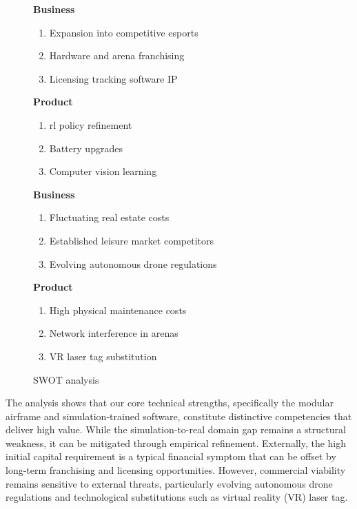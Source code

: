 \documentclass{report_template_oxford}
\begin{document}
\begin{figure}[htbp]
\begin{minipage}{\textwidth}
\begin{tcbraster}[raster columns=2, raster row skip=1mm, boxrule=0mm, arc=0mm]
\begin{tcolorbox}[equal height group=B, size=fbox, colback=swotO!60, colframe=swotO!80!black, title=\textsc{Opportunities}]
\textbf{Business} \vspace{-1em}
\begin{enumerate}
\setlength{\itemsep}{3pt}
\setlength{\parskip}{0pt}
\item Expansion into competitive esports
\item Hardware and arena franchising
\item Licensing tracking software IP
\end{enumerate}
\tcblower
\textbf{Product} \vspace{-1em}
\begin{enumerate}
\setlength{\itemsep}{3pt}
\setlength{\parskip}{0pt}
\item \gls{rl} policy refinement
\item Battery upgrades
\item Computer vision learning
\end{enumerate}
\end{tcolorbox}
\begin{tcolorbox}[equal height group=B, size=fbox, colback=swotT!60, colframe=swotT!80!black, title=\textsc{Threats}]
\textbf{Business} \vspace{-1em}
\begin{enumerate}
\setlength{\itemsep}{3pt}
\setlength{\parskip}{0pt}
\item Fluctuating real estate costs
\item Established leisure market competitors
\item Evolving autonomous drone regulations
\end{enumerate}
\tcblower
\textbf{Product} \vspace{-1em}
\begin{enumerate}
\setlength{\itemsep}{3pt}
\setlength{\parskip}{0pt}
\item High physical maintenance costs
\item Network interference in arenas
\item VR laser tag substitution
\end{enumerate}
\end{tcolorbox}
\end{tcbraster}
\end{minipage}
\caption{SWOT analysis}
\label{fig:swot_analysis}
\end{figure}

The analysis shows that our core technical strengths, specifically the modular airframe and simulation-trained software, constitute distinctive competencies that deliver high value. While the simulation-to-real domain gap remains a structural weakness, it can be mitigated through empirical refinement. Externally, the high initial capital requirement is a typical financial symptom that can be offset by long-term franchising and licensing opportunities. However, commercial viability remains sensitive to external threats, particularly evolving autonomous drone regulations and technological substitutions such as virtual reality (VR) laser tag.
\end{document}
